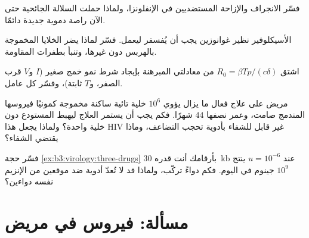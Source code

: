 \begin{exercise}[$\star\star$]\label{exo:b3:virology:8}
فسّر الانجراف والإزاحة المستضديين في الإنفلونزا، ولماذا حملت
السلالة الجائحية حتى الآن راصة دموية جديدة دائمًا.
\end{exercise}

\begin{exercise}[$\star\star$]\label{exo:b3:virology:9}
الأسيكلوفير نظير غوانوزين يجب أن يُفسفر ليعمل.
فسّر لماذا يضر الخلايا المخموجة بالهربس دون غيرها، وتنبأ
بطفرات المقاومة.
\end{exercise}

\begin{exercise}[$\star\star\star$]\label{exo:b3:virology:10}
اشتق $R_{0} = \beta Tp/(c\delta)$ من معادلتي
المبرهنة بإيجاد شرط نمو خمج صغير ($I$ و$V$ قرب
الصفر، و$T$ ثابتة)، وفسّر كل عامل.
\end{exercise}

\begin{exercise}[$\star\star\star$]\label{exo:b3:virology:11}
مريض على علاج فعال ما يزال يؤوي $10^{6}$ خلية تائية ساكنة
مخموجة كمونيًا فيروسها المندمج صامت، وعمر نصفها
$44$ شهرًا. فكم يجب أن يستمر العلاج ليهبط المستودع
دون خلية واحدة؟ ولماذا يجعل هذا HIV غير قابل للشفاء بأدوية
تحجب التضاعف، وماذا يقتضي الشفاء؟
\end{exercise}

\begin{exercise}[$\star\star\star$]\label{exo:b3:virology:12}
فسّر حجة \cref{ex:b3:virology:three-drugs} بأرقامك أنت
 قدره \qty{30}{kb} عند $u = 10^{-6}$ ينتج $10^{9}$
جينوم في اليوم. فكم دواءً تركّب، ولماذا قد لا تُعدّ أدوية
ضد موقعين من الإنزيم نفسه دواءين؟
\end{exercise}

\section{مسألة: فيروس في مريض}

